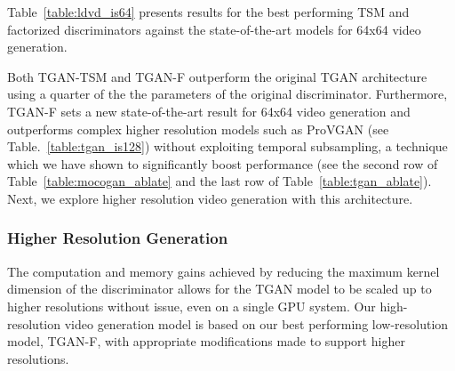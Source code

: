 \documentclass[a4paper,fleqn]{cas-sc}
\begin{document}
Table~\ref{table:ldvd_is64} presents results for the best performing TSM and factorized discriminators against the state-of-the-art models for 64x64 video generation.

Both TGAN-TSM and TGAN-F outperform the original TGAN architecture using a quarter of the the parameters of the original discriminator. Furthermore, TGAN-F sets a new state-of-the-art result for 64x64 video generation and outperforms complex higher resolution models such as ProVGAN (see Table.~\ref{table:tgan_is128}) without exploiting temporal subsampling, a technique which we have shown to significantly boost performance (see the second row of Table~\ref{table:mocogan_ablate} and the last row of Table~\ref{table:tgan_ablate}). Next, we explore higher resolution video generation with this architecture.


\subsubsection{Higher Resolution Generation}
The computation and memory gains achieved by reducing the maximum kernel dimension of the discriminator allows for the TGAN model to be scaled up to higher resolutions without issue, even on a single GPU system. Our high-resolution video generation model is based on our best performing low-resolution model, TGAN-F, with appropriate modifications made to support higher resolutions. 
\end{document}
